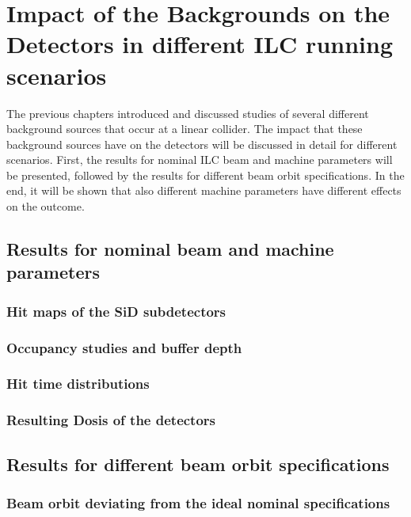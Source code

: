 \chapter{Impact of the Backgrounds on the Detectors in different ILC running scenarios}
\label{EffectDetectors}
The previous chapters introduced and discussed studies of several different background sources that occur at a linear collider.
The impact that these background sources have on the detectors will be discussed in detail for different scenarios.
First, the results for nominal ILC beam and machine parameters will be presented, followed by the results for different beam orbit specifications.
In the end, it will be shown that also different machine parameters have different effects on the outcome.

\section{Results for nominal beam and machine parameters}
\label{EffectDetectors:Nominal}
\subsection{Hit maps of the SiD subdetectors}
\label{EffectDetectors:hitmaps}
\subsection{Occupancy studies and buffer depth}
\label{EffectDetectors:occupancy}
\subsection{Hit time distributions}
\label{EffectDetectors:hittime}
\subsection{Resulting Dosis of the detectors}
\label{EffectDetectors:dosis}

\section{Results for different beam orbit specifications}
\label{EffectDetectors:BeamOrbit}

\subsection{Beam orbit deviating from the ideal nominal specifications}
\label{EffectDetectors:BeamOrbit:otherspecs}
